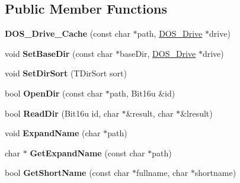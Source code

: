 \subsection*{Public Member Functions}
\begin{DoxyCompactItemize}
\item 
\hypertarget{classDOS__Drive__Cache_a1d2b613312882771a0849446eff0e5f5}{{\bfseries D\-O\-S\-\_\-\-Drive\-\_\-\-Cache} (const char $\ast$path, \hyperlink{classDOS__Drive}{D\-O\-S\-\_\-\-Drive} $\ast$drive)}\label{classDOS__Drive__Cache_a1d2b613312882771a0849446eff0e5f5}

\item 
\hypertarget{classDOS__Drive__Cache_a7b4a442d713f76e2b26ca8d7859396d7}{void {\bfseries Set\-Base\-Dir} (const char $\ast$base\-Dir, \hyperlink{classDOS__Drive}{D\-O\-S\-\_\-\-Drive} $\ast$drive)}\label{classDOS__Drive__Cache_a7b4a442d713f76e2b26ca8d7859396d7}

\item 
\hypertarget{classDOS__Drive__Cache_ac49b22a5b034eb6a9e029f2dce0f4773}{void {\bfseries Set\-Dir\-Sort} (T\-Dir\-Sort sort)}\label{classDOS__Drive__Cache_ac49b22a5b034eb6a9e029f2dce0f4773}

\item 
\hypertarget{classDOS__Drive__Cache_a85aec9a4d7d87913806fa98c96dd2b68}{bool {\bfseries Open\-Dir} (const char $\ast$path, Bit16u \&id)}\label{classDOS__Drive__Cache_a85aec9a4d7d87913806fa98c96dd2b68}

\item 
\hypertarget{classDOS__Drive__Cache_a799a10e1a4ccef7b90d109222d0caedb}{bool {\bfseries Read\-Dir} (Bit16u id, char $\ast$\&result, char $\ast$\&lresult)}\label{classDOS__Drive__Cache_a799a10e1a4ccef7b90d109222d0caedb}

\item 
\hypertarget{classDOS__Drive__Cache_a21a3d68ddb91cf0c8ef5aaa4dc088271}{void {\bfseries Expand\-Name} (char $\ast$path)}\label{classDOS__Drive__Cache_a21a3d68ddb91cf0c8ef5aaa4dc088271}

\item 
\hypertarget{classDOS__Drive__Cache_a35592522c14ab04cb0b4de854fc3dd0e}{char $\ast$ {\bfseries Get\-Expand\-Name} (const char $\ast$path)}\label{classDOS__Drive__Cache_a35592522c14ab04cb0b4de854fc3dd0e}

\item 
\hypertarget{classDOS__Drive__Cache_ae829119eadbb14de58f18339600e81ee}{bool {\bfseries Get\-Short\-Name} (const char $\ast$fullname, char $\ast$shortname)}\label{classDOS__Drive__Cache_ae829119eadbb14de58f18339600e81ee}


\end{DoxyCompactItemize}
